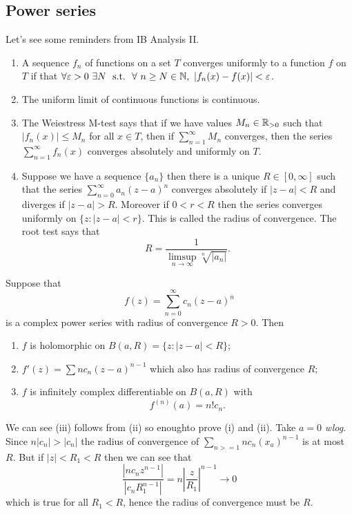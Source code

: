 \documentclass{article}
\begin{document}
\subsection{Power series}
Let's see some reminders from IB Analysis II.
\begin{enumerate}
	\item A sequence $ f_n $ of functions on a set $ T $ converges uniformly to a function $ f $ on $ T $ if that $ \forall \varepsilon>0\ \exists N\ \st \ \forall \ n\ge N\in \N,\ |f_n(x)-f(x)|<\varepsilon $.
	\item The uniform limit of continuous functions is continuous.
	\item The Weiestress M-test says that if we have values $ M_n\in \mathbb{R}_{>0} $ such that $ |f_n(x)|\le M_n $ for all $ x\in T $, then if $ \sum_{n=1}^\infty M_n $ converges, then the series $ \sum_{n=1}^\infty f_n(x) $ converges absolutely and uniformly on $ T $.
	\item Suppose we have a sequence $ \{a_n\} $ then there is a unique $ R\in [0,\infty] $ such that the series $ \sum_{n=0}^\infty a_n (z-a)^n $ converges absolutely if $ |z-a|<R $ and diverges if $ |z-a|>R $. Moreover if $ 0<r<R $ then the series converges uniformly on $ \{z:|z-a|<r\} $. This is called the radius of convergence. The root test says that
		\[
			R = \frac1{\limsup_{n\to\infty} \sqrt[n]{|a_n|}}.
		\]
\end{enumerate}
\begin{theorem}
  Suppose that
  \[
	  f(z) = \sum_{n=0}^\infty c_n(z-a)^n
  \]
  is a complex power series with radius of convergence $ R>0 $. Then
  \begin{enumerate}
	  \item $ f $ is holomorphic on $ B(a,R) = \{z:|z-a|<R\} $;
	  \item $ f'(z) = \sum nc_n(z-a)^{n-1} $ which also has radius of convergence $ R $;
	  \item $ f $ is infinitely complex differentiable on $ B(a,R) $ with
		  \[
			  f^{(n)}(a)= n!c_n.
		  \]
  \end{enumerate}
\end{theorem}
\pf We can see (iii) follows from (ii) so enoughto prove (i) and (ii). Take $ a=0 $ \textit{wlog}. Since $ n|c_n|> |c_n| $ the radius of convergence of $ \sum_{n>= 1} nc_n(x_a)^{n-1} $ is at most $ R $. But if $ |z|< R_1 < R $ then we can see that
\[
	\frac{|nc_n z^{n-1}|}{|c_n R_1^{n-1}|} = n\left|\frac z{R_1}\right|^{n-1}\to 0
\]
which is true for all $ R_1<R $, hence the radius of convergence must be $ R $.\par
\end{document}
